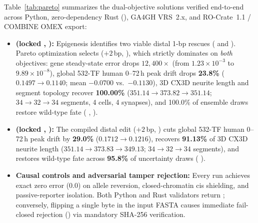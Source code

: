 \documentclass[10.5pt,a4paper]{article}
\begin{document}
Table~\ref{tab:pareto} summarizes the dual-objective solutions verified end-to-end across Python, zero-dependency Rust (), GA4GH VRS~2.x, and RO-Crate~1.1 / COMBINE OMEX export:
\begin{itemize}
\item \textbf{ (locked , ):} Epigenesis identifies two viable distal 1-bp rescues ( and ). Pareto optimization selects \textbf{} ($+2$\,bp, ), which strictly dominates  on \emph{both} objectives: gene steady-state error drops $12{,}400\times$ (from $1.23\times10^{-3}$ to \textbf{$9.89\times10^{-8}$}), global 532-TF human 0--72\,h peak drift drops \textbf{23.8\%} ($0.1497\to 0.1140$; mean $-0.0700$ vs.\ $-0.1130$), 3D CX3D neurite length and segment topology recover \textbf{100.00\%} ($351.14\to 373.82\to 351.14$; $34\to 32\to 34$ segments, 4 cells, 4 synapses), and 100.0\% of ensemble draws restore wild-type fate ( ,  ).
\item \textbf{ (locked , ):} The compiled distal edit \textbf{} ($+2$\,bp, ) cuts global 532-TF human 0--72\,h peak drift by \textbf{29.0\%} ($0.1712\to 0.1216$), recovers \textbf{91.13\%} of 3D CX3D neurite length ($351.14\to 373.83\to 349.13$; $34\to 32\to 34$ segments), and restores wild-type fate across \textbf{95.8\%} of uncertainty draws ( ).
\item \textbf{Causal controls and adversarial tamper rejection:} Every run achieves exact zero error ($0.0$) on allele reversion, closed-chromatin cis shielding, and passive-reporter isolation. Both Python and Rust validators return ; conversely, flipping a single byte in the input FASTA causes immediate fail-closed rejection () via mandatory  SHA-256 verification.
\end{itemize}
\end{document}
